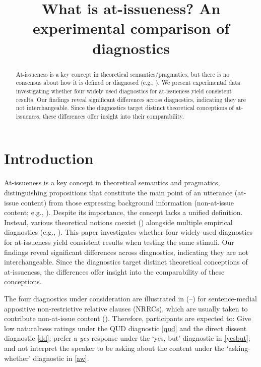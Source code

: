 \documentclass[times,linguex,xcolor]{glossa}
\title[What is at-issueness?]{What is at-issueness? An experimental comparison of diagnostics\\ 
  }
\author[]%
{%
}
\begin{document}
\maketitle


\begin{abstract}
  At-issueness is a key concept in theoretical semantics/pragmatics, but there is no consensus about how it is defined or diagnosed (e.g., \citealt{tonhauser_diagnosing_2012,tonhauser_how_2018,koev_notions_2018}). We present experimental data investigating whether four widely used diagnostics for at-issueness yield consistent results. Our findings reveal significant differences across diagnostics, indicating they are not interchangeable. Since the diagnostics target distinct theoretical conceptions of at-issueness, these differences offer insight into their comparability.

\end{abstract}


\section{Introduction \label{sec:1_introduction}}

  At-issueness is a key concept in theoretical semantics and pragmatics, distinguishing propositions that constitute the main point of an utterance (at-issue content) from those expressing background information (non-at-issue content; e.g., \citealt{karttunen_conventional_1979,horton_presuppositions_1988,abbott_presuppositions_2000,faller_semantics_2003,potts_logic_2005,tonhauser_diagnosing_2012}). Despite its importance, the concept lacks a unified definition. Instead, various theoretical notions coexist (\citealt{koev_notions_2018,tonhauser_how_2018}) alongside multiple empirical diagnostics (e.g., \citealt{tonhauser_diagnosing_2012}).
  This paper investigates whether four widely‐used diagnostics for at-issueness yield consistent results when testing the same stimuli. Our findings reveal significant differences across diagnostics, indicating they are not interchangeable. Since the diagnostics target distinct theoretical conceptions of at-issueness, the differences offer insight into the comparability of these conceptions.

  The four diagnostics under consideration are illustrated in (--) for sentence-medial appositive non-restrictive relative clauses (NRRCs), which are usually taken to contribute non-at-issue content (\citealt{potts_logic_2005}). Therefore, participants are expected to: Give low naturalness ratings under the QUD diagnostic \ref{qud} and the direct dissent diagnostic \ref{dd}; prefer a \emph{yes}-response under the `yes, but' diagnostic in \ref{yesbut}; and not interpret the speaker to be asking about the content under the `asking-whether' diagnostic in \ref{aw}.
\end{document}
